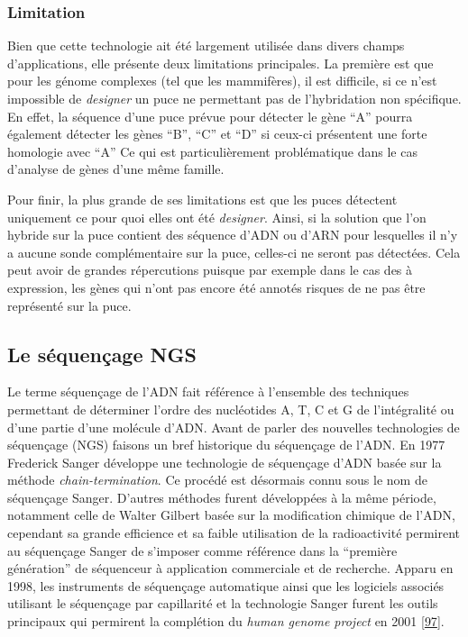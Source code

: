 \documentclass[12pt,twoside]{reedthesis}
\theoremstyle{definition}
\theoremstyle{definition}
\theoremstyle{remark}
\begin{document}
  \subsubsection{Limitation}\label{limitation}
  
  Bien que cette technologie ait été largement utilisée dans divers champs
  d'applications, elle présente deux limitations principales. La première
  est que pour les génome complexes (tel que les mammifères), il est
  difficile, si ce n'est impossible de \emph{designer} un puce ne
  permettant pas de l'hybridation non spécifique. En effet, la séquence
  d'une puce prévue pour détecter le gène ``A'' pourra également détecter
  les gènes ``B'', ``C'' et ``D'' si ceux-ci présentent une forte
  homologie avec ``A'' Ce qui est particulièrement problématique dans le
  cas d'analyse de gènes d'une même famille.
  
  Pour finir, la plus grande de ses limitations est que les puces
  détectent uniquement ce pour quoi elles ont été \emph{designer}. Ainsi,
  si la solution que l'on hybride sur la puce contient des séquence d'ADN
  ou d'ARN pour lesquelles il n'y a aucune sonde complémentaire sur la
  puce, celles-ci ne seront pas détectées. Cela peut avoir de grandes
  répercutions puisque par exemple dans le cas des à expression, les gènes
  qui n'ont pas encore été annotés risques de ne pas être représenté sur
  la puce.
  
  \newpage
  
  \hypertarget{ngs}{\subsection{Le séquençage NGS}\label{ngs}}
  
  Le terme séquençage de l'ADN fait référence à l'ensemble des techniques
  permettant de déterminer l'ordre des nucléotides A, T, C et G de
  l'intégralité ou d'une partie d'une molécule d'ADN. Avant de parler des
  nouvelles technologies de séquençage (NGS) faisons un bref historique du
  séquençage de l'ADN. En 1977 Frederick Sanger développe une technologie
  de séquençage d'ADN basée sur la méthode \emph{chain-termination}. Ce
  procédé est désormais connu sous le nom de séquençage Sanger. D'autres
  méthodes furent développées à la même période, notamment celle de Walter
  Gilbert basée sur la modification chimique de l'ADN, cependant sa grande
  efficience et sa faible utilisation de la radioactivité permirent au
  séquençage Sanger de s'imposer comme référence dans la ``première
  génération'' de séquenceur à application commerciale et de recherche.
  Apparu en 1998, les instruments de séquençage automatique ainsi que les
  logiciels associés utilisant le séquençage par capillarité et la
  technologie Sanger furent les outils principaux qui permirent la
  complétion du \emph{human genome project} en 2001
  {[}\protect\hyperlink{ref-Collins2003}{97}{]}.
  
\end{document}
